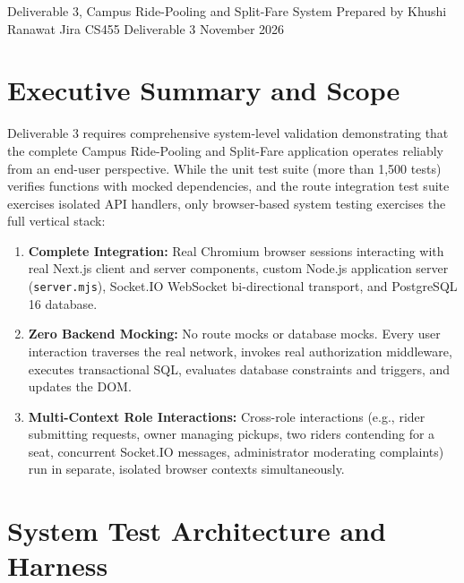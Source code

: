\documentclass[10pt]{article}
\begin{document}
  {Deliverable 3, Campus Ride-Pooling and Split-Fare System}
  {Prepared by Khushi Ranawat \quad Jira CS455 Deliverable 3 \quad November 2026}


\section{Executive Summary and Scope}

Deliverable 3 requires comprehensive system-level validation demonstrating that the complete Campus Ride-Pooling and Split-Fare application operates reliably from an end-user perspective. While the unit test suite (more than 1,500 tests) verifies functions with mocked dependencies, and the route integration test suite exercises isolated API handlers, only browser-based system testing exercises the full vertical stack:
\begin{enumerate}
  \item \textbf{Complete Integration:} Real Chromium browser sessions interacting with real Next.js client and server components, custom Node.js application server (\texttt{server.mjs}), Socket.IO WebSocket bi-directional transport, and PostgreSQL 16 database.
  \item \textbf{Zero Backend Mocking:} No route mocks or database mocks. Every user interaction traverses the real network, invokes real authorization middleware, executes transactional SQL, evaluates database constraints and triggers, and updates the DOM.
  \item \textbf{Multi-Context Role Interactions:} Cross-role interactions (e.g., rider submitting requests, owner managing pickups, two riders contending for a seat, concurrent Socket.IO messages, administrator moderating complaints) run in separate, isolated browser contexts simultaneously.
\end{enumerate}

\section{System Test Architecture and Harness}
\end{document}
